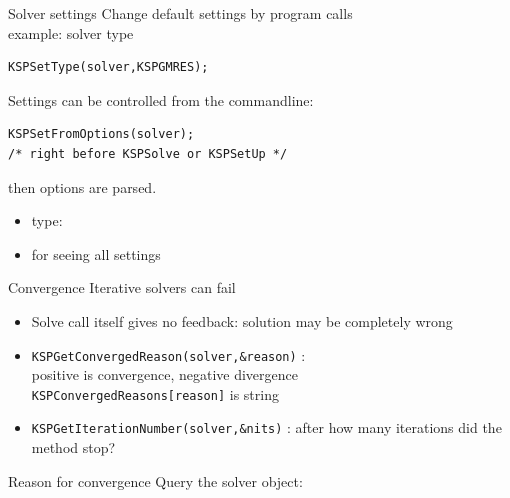 \begin{longstory}

\begin{numberedframe}{Solver settings}
  Change default settings by program calls\\
  example: solver type
\begin{lstlisting}
KSPSetType(solver,KSPGMRES);
\end{lstlisting}

Settings can be controlled from the commandline:
\begin{lstlisting}
KSPSetFromOptions(solver);
/* right before KSPSolve or KSPSetUp */
\end{lstlisting}
then options  are parsed.
\begin{itemize}
\item type: 
\item {} for seeing all settings
\end{itemize}
\end{numberedframe}

\begin{numberedframe}{Convergence}
Iterative solvers can fail
  \begin{itemize}
  \item Solve call itself gives no feedback: solution may be completely wrong
  \item \lstinline{KSPGetConvergedReason(solver,&reason)} : \\
    positive is convergence, negative divergence \\
    \lstinline{KSPConvergedReasons[reason]} is string      
  \item \lstinline{KSPGetIterationNumber(solver,&nits)} : after how many
    iterations did the method stop?
  \end{itemize}
\end{numberedframe}

\begin{numberedframe}{Reason for convergence}
  Query the solver object:
  
\end{numberedframe}


\end{longstory}
